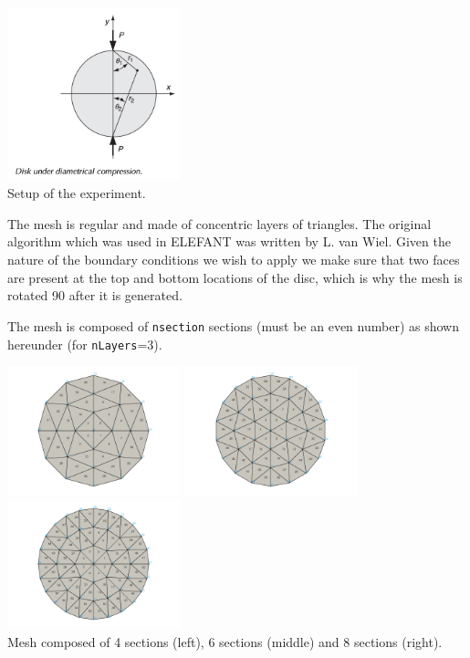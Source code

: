 \begin{center}
\includegraphics[width=5cm]{python_codes/fieldstone_58/experiment1/setup}\\
{\captionfont Setup of the experiment.}
\end{center}

The mesh is regular and made of concentric layers of triangles. The original algorithm
which was used in ELEFANT was written by L. van Wiel.  Given the nature of the boundary 
conditions we wish to apply we make sure that two faces are present at the top and bottom 
locations of the disc, which is why the mesh is rotated 90\degree 
after it is generated.  

The mesh is composed of {\tt nsection} sections (must be an even number)
as shown hereunder (for {\tt nLayers}=3). 
\begin{center}
\includegraphics[width=5cm]{python_codes/fieldstone_58/images/mesh4}
\includegraphics[width=5cm]{python_codes/fieldstone_58/images/mesh6}
\includegraphics[width=5cm]{python_codes/fieldstone_58/images/mesh8}\\
{\captionfont Mesh composed of 4 sections (left), 6 sections (middle) and 8 sections (right).}
\end{center}

